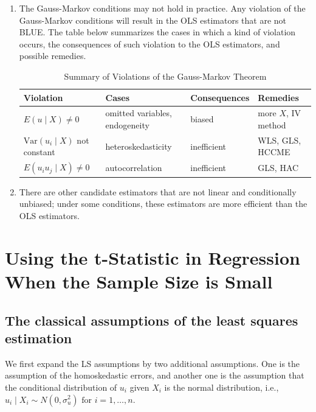\documentclass[a4paper,11pt]{article}
\newcommand{\var}{\mathrm{Var}}
\begin{document}
\begin{enumerate}
\item The Gauss-Markov conditions may not hold in practice. Any violation
of the Gauss-Markov conditions will result in the OLS estimators
that are not BLUE. The table below summarizes the cases in which a
kind of violation occurs, the consequences of such violation to the
OLS estimators, and possible remedies.

\begin{table}[htbp]
\caption{Summary of Violations of the Gauss-Markov Theorem}
\centering
\small
\begin{tabular}{p{4cm}|p{5.5cm}|p{2.5cm}|p{3.4cm}}
\toprule
Violation & Cases & Consequences & Remedies\\
\midrule
\(E(u \mid X) \neq 0\) & omitted variables, endogeneity & biased & more \(X\), IV method\\
\(\var(u_i\mid X)\) not constant & heteroskedasticity & inefficient & WLS, GLS, HCCME\\
\(E(u_{i}u_{j}\mid X) \neq 0\) & autocorrelation & inefficient & GLS, HAC\\
\bottomrule
\end{tabular}
\end{table}

\item There are other candidate estimators that are not linear and
conditionally unbiased; under some conditions, these estimators are
more efficient than the OLS estimators.
\end{enumerate}


\section{Using the t-Statistic in Regression When the Sample Size is Small}
\label{sec:org85c7aad}

\subsection{The classical assumptions of the least squares estimation}
\label{sec:orgfe2892e}

We first expand the LS assumptions by two additional assumptions. One
is the assumption of the homoskedastic errors, and another one is the
assumption that the conditional distribution of \(u_i\) given \(X_i\) is
the normal distribution, i.e., \(u_i \mid X_i \sim N(0, \sigma^2_u) \text{ for }
i = 1, \ldots, n\).
\end{document}
